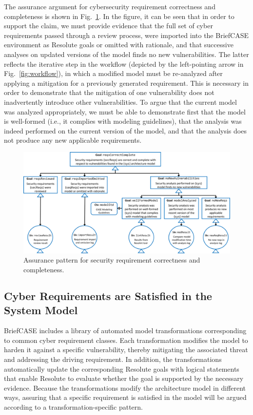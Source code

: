 The assurance argument for cybersecurity requirement correctness and completeness is shown in Fig.~\ref{fig:req-correct-complete}.  
In the figure, it can be seen that in order to support the claim, we must provide evidence that the full set of cyber requirements passed through a review process, were imported into the BriefCASE environment as Resolute goals or omitted with rationale, and that successive analyses on updated versions of the model finds no new vulnerabilities.  The latter reflects the iterative step in the workflow (depicted by the left-pointing arrow in Fig.~\ref{fig:workflow}), in which a modified model must be re-analyzed after applying a mitigation for a previously generated requirement.  This is necessary in order to demonstrate that the mitigation of one vulnerability does not inadvertently introduce other vulnerabilities.  To argue that the current model was analyzed appropriately, we must be able to demonstrate first that the model is well-formed (i.e., it complies with modeling guidelines), that the analysis was indeed performed on the current version of the model, and that the analysis does not produce any new applicable requirements.



\begin{figure}[h] 
	\centering 
	\includegraphics[width=\textwidth]{figs/req-correct-complete.png}
	\caption{Assurance pattern for security requirement correctness and completeness.}
	\label{fig:req-correct-complete} 
\end{figure}

\subsection{Cyber Requirements are Satisfied in the System Model}
\label{sec:requirements-satisfied-in-model}
BriefCASE includes a library of automated model transformations corresponding to common cyber requirement classes.  Each transformation modifies the model to harden it against a specific vulnerability, thereby mitigating the associated threat and addressing the driving requirement.  In addition, the transformations automatically update the corresponding Resolute goals with logical statements that enable Resolute to evaluate whether the goal is supported by the necessary evidence.
%
Because the transformations modify the architecture model in different ways, assuring that a specific requirement is satisfied in the model will be argued according to a transformation-specific pattern.  

